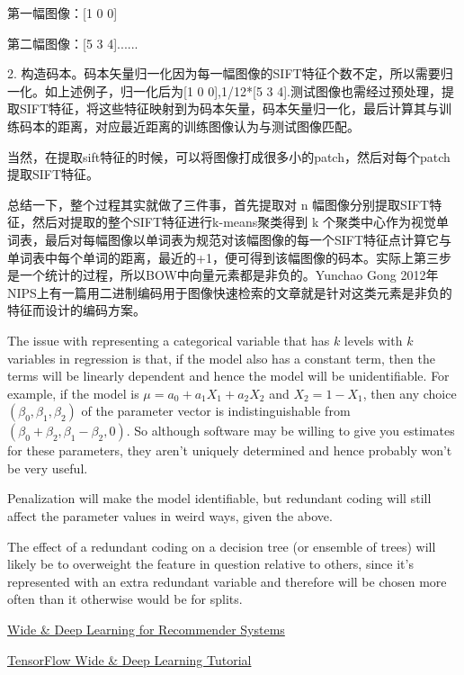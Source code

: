 \documentclass[10pt,a4paper]{ctexbook}
\begin{document}
第一幅图像：[1 0 0]

第二幅图像：[5 3 4]......

 

2. 构造码本。码本矢量归一化因为每一幅图像的SIFT特征个数不定，所以需要归一化。如上述例子，归一化后为[1 0 0],1/12*[5 3 4].测试图像也需经过预处理，提取SIFT特征，将这些特征映射到为码本矢量，码本矢量归一化，最后计算其与训练码本的距离，对应最近距离的训练图像认为与测试图像匹配。

 

当然，在提取sift特征的时候，可以将图像打成很多小的patch，然后对每个patch提取SIFT特征。

 

总结一下，整个过程其实就做了三件事，首先提取对 n 幅图像分别提取SIFT特征，然后对提取的整个SIFT特征进行k-means聚类得到 k 个聚类中心作为视觉单词表，最后对每幅图像以单词表为规范对该幅图像的每一个SIFT特征点计算它与单词表中每个单词的距离，最近的+1，便可得到该幅图像的码本。实际上第三步是一个统计的过程，所以BOW中向量元素都是非负的。Yunchao Gong 2012年NIPS上有一篇用二进制编码用于图像快速检索的文章就是针对这类元素是非负的特征而设计的编码方案。


The issue with representing a categorical variable that has $k$ levels with $k$ variables in regression is that, if the model also has a constant term, then the terms will be linearly dependent and hence the model will be unidentifiable. For example, if the model is $\mu=a_{0}+a_{1}X_{1}+a_{2}X_{2}$ and $X_{2}=1-X_{1}$, then any choice $(\beta_{0},\beta_{1},\beta_{2})$ of the parameter vector is indistinguishable from $(\beta_{0}+\beta_{2},\beta_{1}-\beta_{2},0)$. So although software may be willing to give you estimates for these parameters, they aren't uniquely determined and hence probably won't be very useful.

Penalization will make the model identifiable, but redundant coding will still affect the parameter values in weird ways, given the above.

The effect of a redundant coding on a decision tree (or ensemble of trees) will likely be to overweight the feature in question relative to others, since it's represented with an extra redundant variable and therefore will be chosen more often than it otherwise would be for splits.




\href{https://arxiv.org/abs/1606.07792}{Wide \& Deep Learning for Recommender Systems}


\href{https://www.tensorflow.org/tutorials/wide_and_deep}{TensorFlow Wide \& Deep Learning Tutorial}
\end{document}

